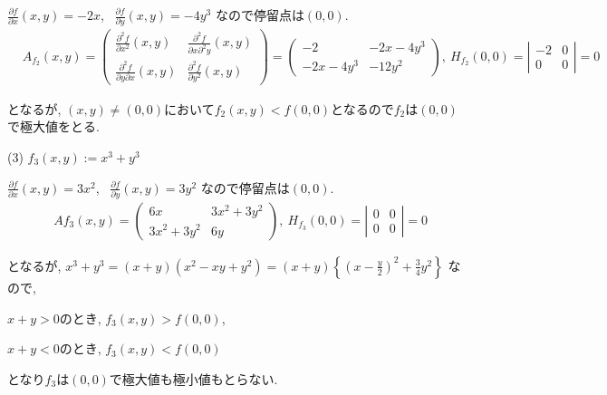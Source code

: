 \documentclass{jsarticle}
\begin{document}
$\displaystyle\frac{\partial f}{\partial x}(x, y) = -2x$, \ 
$\displaystyle\frac{\partial f}{\partial y}(x, y) = -4y^3$ なので停留点は$(0,0)$.
$$
\begin{aligned}
& A_{f_2}(x, y)=\left(\begin{array}{cc}
\displaystyle\frac{\partial^2 f}{\partial x^2}(x, y) & \displaystyle\frac{\partial^2 f}{\partial x \partial^2 y}(x, y) \\
\displaystyle\frac{\partial^2 f}{\partial y \partial x}(x, y) & \displaystyle\frac{\partial^2 f}{\partial y^2}(x, y)
\end{array}\right)=\left(\begin{array}{cc}
-2 & -2 x-4 y^3 \\
-2 x-4 y^3 & -12 y^2
\end{array}\right) , \ H_{f_2}(0,0)=\left|\begin{array}{ll}
-2 & 0 \\
0 & 0
\end{array}\right|=0
\end{aligned}
$$

となるが, $(x,y) \neq (0,0)$において$f_2(x,y)<f(0,0)$となるので$f_2$は$(0,0)$で極大値をとる.

\bigskip
\bigskip
\bigskip

(3)
$f_3(x,y) := x^3+y^3$

\bigskip

$\displaystyle\frac{\partial f}{\partial x}(x, y) = 3x^2$, \ 
$\displaystyle\frac{\partial f}{\partial y}(x, y) = 3y^2$ なので停留点は$(0,0)$.
$$
\begin{aligned}
& A f_3(x, y)=\left(\begin{array}{cc}
6 x & 3 x^2+3 y^2 \\
3 x^2+3 y^2 & 6 y
\end{array}\right) , \ H_{f_3}(0,0)=\left|\begin{array}{ll}
0 & 0 \\
0 & 0
\end{array}\right|=0
\end{aligned}
$$

となるが, $x^3+y^3=(x+y)(x^2-xy+y^2)=(x+y)\left\{(x-\displaystyle\frac{y}{2})^2 + \frac{3}{4}y^2\right\}$ なので,

$x+y>0$のとき, $f_3(x,y)>f(0,0)$,

$x+y<0$のとき, $f_3(x,y)<f(0,0)$

となり$f_3$は$(0,0)$で極大値も極小値もとらない.
\end{document}
